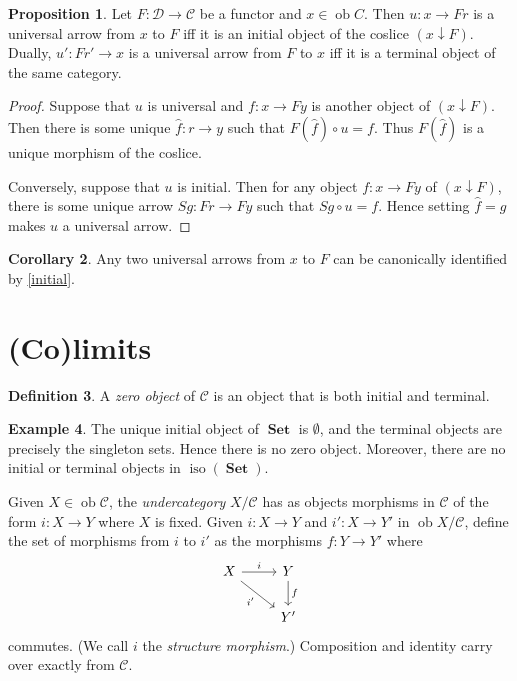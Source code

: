 \documentclass[10pt,letterpaper,cm]{nupset}
\theoremstyle{definition}
\newtheorem{definition}{Definition}[section]
\newtheorem{exmp}[definition]{Example}
\theoremstyle{theorem}
\newtheorem{corollary}[definition]{Corollary}
\newtheorem{prop}[definition]{Proposition}
\theoremstyle{remark}
\newcommand{\1}{\mathbf{1}}
\renewcommand{\c}{\mathscr{C}}
\renewcommand{\d}{\mathscr{D}}
\newcommand{\0}{\vec 0}
\DeclareMathOperator{\ob}{ob}
\DeclareMathOperator{\iso}{iso}
\DeclareMathOperator{\set}{\mathbf{Set}}
\begin{document}
\begin{prop}
Let $F : \d \to \c$ be a functor and $x \in \ob C$. Then $u : x \to Fr$ is a universal arrow from $x$ to $F$ iff it is an initial object of the coslice $\left(x \downarrow F\right)$. Dually, $u' : Fr' \to x$ is a universal arrow from $F$ to $x$  iff it is a terminal object of the same category.
\end{prop}
\begin{proof}
Suppose that $u$ is universal and $f: x \to Fy$ is another object of $\left(x \downarrow F\right)$. Then there is some unique $\hat{f}: r \to y$ such that $F\left(\hat{f}\right) \circ u = f$. Thus $F\left(\hat{f}\right)$ is a unique morphism of the coslice.

\smallskip

Conversely, suppose that $u$ is initial. Then for any object $f: x \to Fy$ of $\left(x \downarrow F\right)$, there is some unique arrow $Sg : Fr \to Fy$ such that $Sg \circ u = f$. Hence setting $\hat{f} = g$ makes $u$ a universal arrow.
\end{proof}

\begin{corollary}
Any two universal arrows from $x$ to $F$ can be canonically identified by \cref{initial}.
\end{corollary}

\section{(Co)limits}

\begin{definition}
A \textit{zero object} of $\c$ is an object that is both initial and terminal.
\end{definition}

\begin{exmp}
The unique initial object of $\set$ is $\emptyset$, and the terminal objects are precisely the singleton sets. Hence there is no zero object. Moreover, there are no initial or terminal objects in $\iso(\set)$.
\end{exmp}


Given $X \in \ob \c$, the \textit{undercategory} ${X}/{\c}$ has as objects morphisms in $\c$ of the form $i : X \to Y$ where $X$ is fixed. Given $i: X \to Y$ and  $i' : X \to Y'$ in $\ob {X}/{\c}$, define the set of morphisms from $i$ to $i'$ as the morphisms $f: Y \to Y'$ where
\[ \begin{tikzcd}
X \arrow[r, "i"] \arrow[swap, dr,  " i' "] & Y \arrow[d, "f"] \\%
 & Y'
\end{tikzcd}
\]
commutes. (We call $i$ the \textit{structure morphism}.)
 Composition and identity carry over exactly from $\c$.
\end{document}
